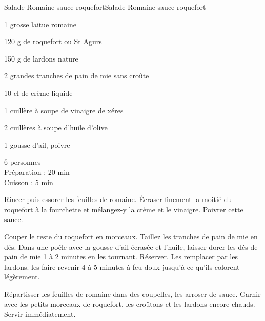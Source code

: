 \begin{recette}{Salade Romaine sauce roquefort}{Salade Romaine sauce roquefort}
\begin{ingredients}
 1 grosse laitue romaine \par
 120 g de roquefort ou St Agurs \par
 150 g de lardons nature \par
 2 grandes tranches de pain de mie sans croûte \par
 10 cl de crème liquide \par
 1 cuillère à soupe de vinaigre de xéres \par
 2 cuillères à soupe d'huile d'olive \par
 1 gousse d'ail, poivre 
\end{ingredients}
\begin{infos}
 6 personnes	\\	%
 Préparation : 20 min \\		%
 Cuisson : 5 min			%
\end{infos}
\begin{etapes}
\item Rincer puis essorer les feuilles de romaine. Écraser finement la moitié du roquefort à la fourchette et mélangez-y la crème et le vinaigre. Poivrer cette sauce.
\item Couper le reste du roquefort en morceaux. Taillez les tranches de pain de mie en dés. Dans une poêle avec la gousse d'ail écrasée et l'huile, laisser dorer les dés de pain de mie 1 à 2 minutes en les tournant. Réserver. Les remplacer par les lardons. les faire revenir 4 à 5 minutes à feu doux jusqu'à ce qu'ils colorent légèrement.
\item Répartisser les feuilles de romaine dans des coupelles, les arroser de sauce. Garnir avec les petits morceaux de roquefort, les croûtons et les lardons encore chauds. Servir immédiatement.
\end{etapes}
\end{recette}